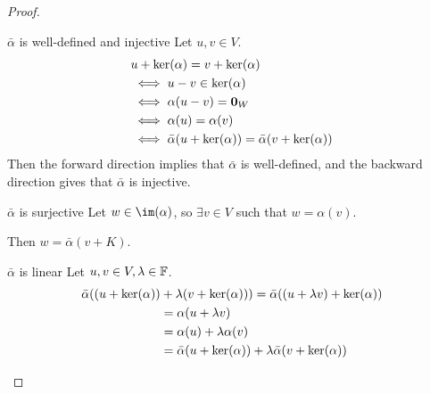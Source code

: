 \documentclass[../Main.tex]{subfiles}
\begin{document}
\begin{proof}
    \begin{subproof}{$\bar{\alpha}$ is well-defined and injective}
        Let $u, v \in V$.
        \begin{align*}
            &u + \ker(\alpha) = v + \ker(\alpha) \\
            &\iff u - v \in \ker(\alpha) \\
            &\iff \alpha(u - v) = \boldsymbol{0}_W \\
            &\iff \alpha(u) = \alpha(v) \\
            &\iff \bar\alpha (u + \ker(\alpha)) = \bar\alpha(v + \ker(\alpha))
        \end{align*}
        Then the forward direction implies that $\bar\alpha$ is well-defined, and the backward direction gives that $\bar\alpha$ is injective.
    \end{subproof}
    \begin{subproof}{$\bar\alpha$ is surjective}
        Let $w \in \im(\alpha)$, so $\exists v \in V$ such that $w = \alpha(v)$.

        Then $w = \bar\alpha(v + K)$.
    \end{subproof}
    \begin{subproof}{$\bar\alpha$ is linear}
        Let $u, v \in V, \lambda \in \mathbb{F}$.
        \begin{align*}
            \bar\alpha((u + \ker(\alpha)) &+ \lambda (v + \ker(\alpha))) = \bar\alpha((u + \lambda v) + \ker(\alpha)) \\
            &= \alpha(u + \lambda v) \\
            &= \alpha(u) + \lambda \alpha(v) \\
            &= \bar\alpha(u + \ker(\alpha)) + \lambda\bar\alpha(v + \ker(\alpha))
        \end{align*}
    \end{subproof}
\end{proof}
\end{document}
